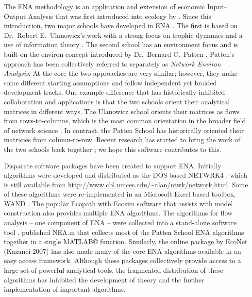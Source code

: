 \documentclass[article]{jss}
\begin{document}
The ENA methodology is an application and extension of economic
Input--Output Analysis \citep{leontief1936,leontief66} that was first
introduced into ecology by \citet{hannon73}.  Since this introduction, two major schools have
developed in ENA \citep{scharler09comparing}.  The first is based on Dr.\ Robert E.\ Ulanowicz's
work with a strong focus on trophic dynamics and a use of information
theory \citep{ulanowicz86, ulanowicz97, ulanowicz04}.  The second
school has an environment focus and is built on the environ concept
introduced by Dr.\ Bernard C.\ Patten \citep{patten76, patten78,
  fath99_review}.  Patten's approach has been collectively referred to
separately as \emph{Network Environ Analysis}. At the core the two
approaches are very similar; however, they make some different
starting assumptions and follow independent yet braided development
tracks. One example difference that has historically inhibited
collaboration and applications is that the two schools orient their
analytical matrices in different ways.  The Ulanowicz school orients
their matrices as flows from rows-to-columns, which is the most common
orientation in the broader field of network science
\citep[e.g.,][]{brandes05}.  In contrast, the Patten School has
historically oriented their matricies from column-to-row.  Recent
research has started to bring the work of the two schools back
together \citep[e.g.,][]{scharler09comparing}; we hope this software
contributes to this.


Disparate software packages have been created to support
ENA. Initially algorithms were developed and distributed as the DOS
based NETWRK4 \cite{ulanowicz91}, which is still available from
\url{http://www.cbl.umces.edu/~ulan/ntwk/network.html}.  Some of these
algorithms were re-implemented in an Microsoft Excel based toolbox,
WAND \cite{allesina04_wand}. The popular Ecopath with Ecosim software
that assists with model construction \citep{christensen04} also
provides multiple ENA algorithms.  The algorithms for flow analysis -- one component of ENA -- were collected into a stand-alone software tool \citep{latham2006}.  \citet{fath06} published NEA.m that
collects most of the Patten School ENA algorithms together in a single MATLAB\copyright
function. Similarly, the online package by EcoNet (Kazanci 2007) has
also made many of the core ENA algorithms available in an easy access
framework.  Although these packages collectively provide access to a
large set of powerful analytical tools, the fragmented distribution of
these algorithms has inhibited the development of theory and the
further implementation of important algorithms.
\end{document}
